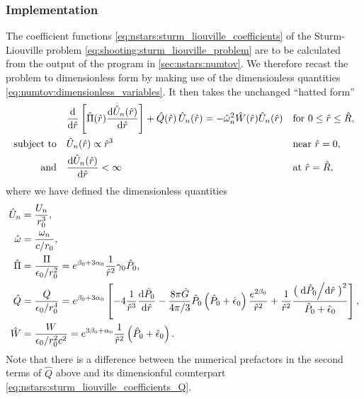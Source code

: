 \subsubsection{Implementation}

The coefficient functions \eqref{eq:nstars:sturm_liouville_coefficients} of the Sturm-Liouville problem \eqref{eq:shooting:sturm_liouville_problem} are to be calculated from the output of the program in \cref{sec:nstars:numtov}.
We therefore recast the problem to dimensionless form by making use of the dimensionless quantities \eqref{eq:numtov:dimensionless_variables}.
It then takes the unchanged ``hatted form''
\begin{subequations}
\begin{align}
	&\odv*{ \left[ \hat{\Pi}(\hat{r}) \odv{\hat{U}_n(\hat{r})}{\hat{r}} \right] }{\hat{r}} + \hat{Q}(\hat{r}) \, \hat{U}_n(\hat{r}) = -\hat{\omega}_n^2 \hat{W}(\hat{r}) \hat{U}_n(\hat{r}) && \text{for } 0 \leq \hat{r} \leq \hat{R} , \\
	\text{subject to} \quad & \hat{U}_n(\hat{r})          \propto \hat{r}^3    && \text{near } \hat{r}=0 , \\
	\text{and}        \quad & \odv{\hat{U}_n(\hat{r})}{\hat{r}} <       \infty && \text{at } \hat{r}=\hat{R} ,
\end{align}%
\end{subequations}%
where we have defined the dimensionless quantities
\begin{subequations}
\begin{align}
	\hat{U}_n    &= \frac{U_n}{r_0^3} , \\ 
	\hat{\omega} &= \frac{\omega_n}{c/r_0} , \\ 
	\hat{\Pi}    &= \frac{\Pi}{\epsilon_0 / r_0^2}   = e^{\beta_0 + 3 \alpha_0} \frac{1}{\hat{r}^2} \gamma_0 \hat{P}_0 , \\
	\hat{Q}      &= \frac{Q}{\epsilon_0 / r_0^4}     = e^{\beta_0 + 3 \alpha_0} \left[ -4 \frac{1}{\hat{r}^3} \odv{\hat{P}_0}{\hat{r}} - \frac{8 \pi \hat{G}}{4 \pi / 3} \hat{P}_0 \left( \hat{P}_0 + \hat{\epsilon}_0 \right) \frac{e^{2 \beta_0}}{\hat{r}^2} + \frac{1}{\hat{r}^2} \frac{\big( \odv{\hat{P}_0}/{\hat{r}} \big)^2}{\hat{P}_0 + \hat{\epsilon}_0} \right] , \\
	\hat{W}      &= \frac{W}{\epsilon_0 / r_0^2 c^2} = e^{3 \beta_0 + \alpha_0} \frac{1}{\hat{r}^2} \left( \hat{P}_0 + \hat{\epsilon}_0 \right) .
\end{align}%
\label{eq:shooting:dimensionless_variables}%
\end{subequations}%
Note that there is a difference between the numerical prefactors in the second terms of $\hat{Q}$ above and its dimensionful counterpart \eqref{eq:nstars:sturm_liouville_coefficients_Q}.

